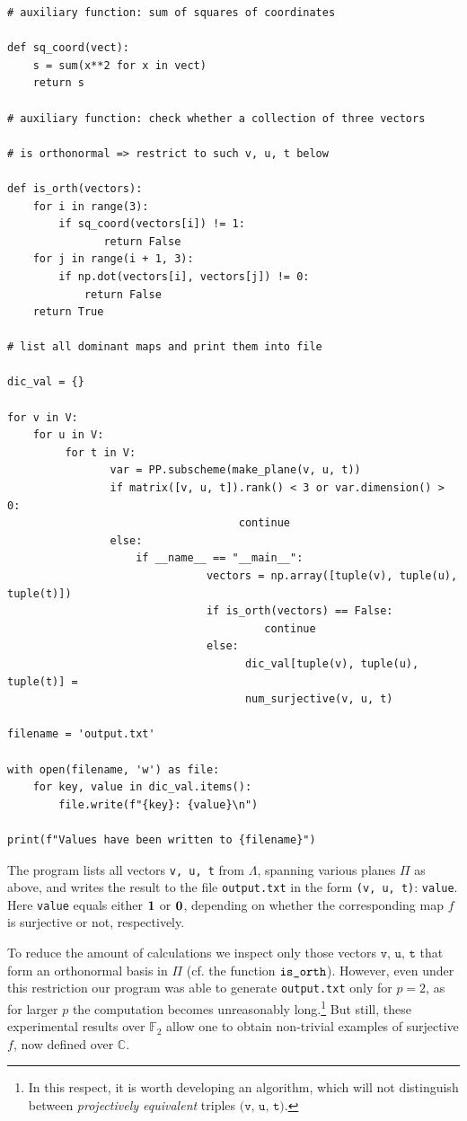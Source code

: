 \documentclass[14pt]{amsart}
\theoremstyle{definition}
\theoremstyle{remark}
\newcommand{\com}{\mathbb{C}}
\begin{document}
{\begin{lstlisting}
# auxiliary function: sum of squares of coordinates

def sq_coord(vect):
    s = sum(x**2 for x in vect)
    return s

# auxiliary function: check whether a collection of three vectors

# is orthonormal => restrict to such v, u, t below

def is_orth(vectors):
    for i in range(3):
        if sq_coord(vectors[i]) != 1:
               return False
    for j in range(i + 1, 3):
        if np.dot(vectors[i], vectors[j]) != 0:
            return False
    return True

# list all dominant maps and print them into file

dic_val = {}

for v in V:
    for u in V:
         for t in V:
                var = PP.subscheme(make_plane(v, u, t))
                if matrix([v, u, t]).rank() < 3 or var.dimension() > 0:
                                    continue
                else:
                    if __name__ == "__main__":
                               vectors = np.array([tuple(v), tuple(u), tuple(t)])
                               if is_orth(vectors) == False:
                                        continue
                               else:
                                     dic_val[tuple(v), tuple(u), tuple(t)] =
                                     num_surjective(v, u, t)

filename = 'output.txt'

with open(filename, 'w') as file:
    for key, value in dic_val.items():
        file.write(f"{key}: {value}\n")

print(f"Values have been written to {filename}")

\end{lstlisting}
}

\medskip

The program lists all vectors {\texttt{v, u, t}} from $\Lambda$,
spanning various planes $\Pi$ as above, and writes the result to
the file \texttt{output.txt} in the form \texttt{(v, u, t)}:
\texttt{value}. Here \texttt{value} equals either ${\bf 1}$ or
${\bf 0}$, depending on whether the corresponding map $f$ is
surjective or not, respectively.

To reduce the amount of calculations we inspect only those vectors
$\texttt{v, u, t}$ that form an orthonormal basis in $\Pi$ (cf.
the function $\verb"is_orth"$). However, even under this
restriction our program was able to generate \texttt{output.txt}
only for $p = 2$, as for larger $p$ the computation becomes
unreasonably long.\footnote{In this respect, it is worth
developing an algorithm, which will not distinguish between
\emph{projectively equivalent} triples $\texttt{(v, u, t)}$.} But
still, these experimental results over $\mathbb{F}_2$ allow one to
obtain non-trivial examples of surjective $f$, now defined over
$\com$.
\end{document}
